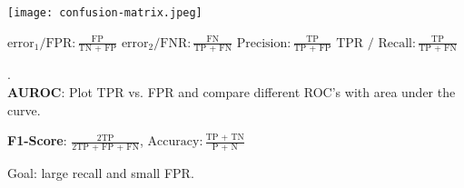 \begin{multicols*}{2}
	\begin{center}
		\texttt{[image: confusion-matrix.jpeg]}
	\end{center}
	
	$\text{error}_1 / \text{FPR}: \frac{\text{FP}}{\text{TN + FP}}$
	$\text{error}_2 / \text{FNR}: \frac{\text{FN}}{\text{TP + FN}}$
	$\text{Precision}: \frac{\text{TP}}{\text{TP + FP}}$
	$\text{TPR / Recall}: \frac{\text{TP}}{\text{TP + FN}}$
\end{multicols*}

.\\[-20pt]
\textbf{AUROC}: Plot TPR vs. FPR and compare different ROC's with area under the curve.

\textbf{F1-Score}: $\frac{2\text{TP}}{2\text{TP + FP + FN}}$, $\text{Accuracy}: \frac{\text{TP + TN}}{\text{P + N}}$

Goal: large recall and small FPR.
  